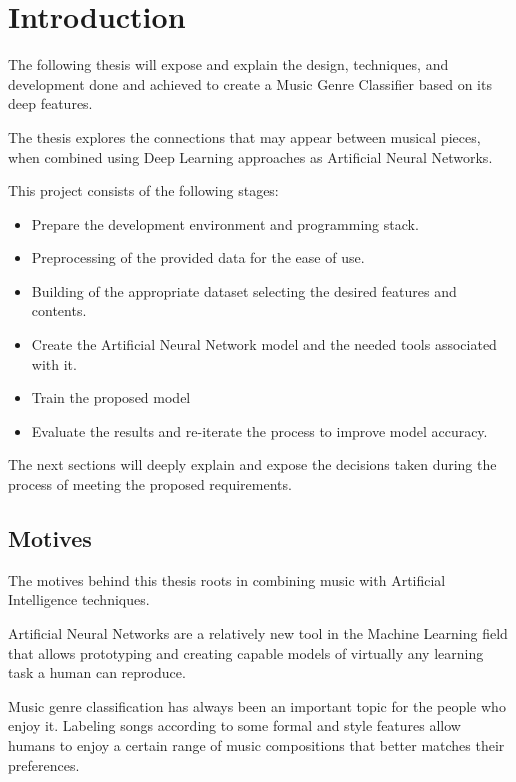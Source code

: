 
\chapter{Introduction}

\label{introduction}
The following thesis will expose and explain the design, techniques, and development done and achieved to create a Music Genre Classifier based on its deep features.

The thesis explores the connections that may appear between musical pieces, when combined using Deep Learning approaches as Artificial Neural Networks.

This project consists of the following stages:

\begin{itemize}
    \item Prepare the development environment and programming stack.
    \item Preprocessing of the provided data for the ease of use.
    \item Building of the appropriate dataset selecting the desired features and contents.
    \item Create the Artificial Neural Network model and the needed tools associated with it.
    \item Train the proposed model
    \item Evaluate the results and re-iterate the process to improve model accuracy.
\end{itemize}
  
The next sections will deeply explain and expose the decisions taken during the process of meeting the proposed requirements.
\newpage

\section{Motives}
The motives behind this thesis roots in combining music with Artificial Intelligence techniques.

Artificial Neural Networks are a relatively new tool in the Machine Learning field that allows prototyping and creating capable models of virtually any learning task a human can reproduce.

Music genre classification has always been an important topic for the people who enjoy it. Labeling songs according to some formal and style features allow humans to enjoy a certain range of music compositions that better matches their preferences. 

